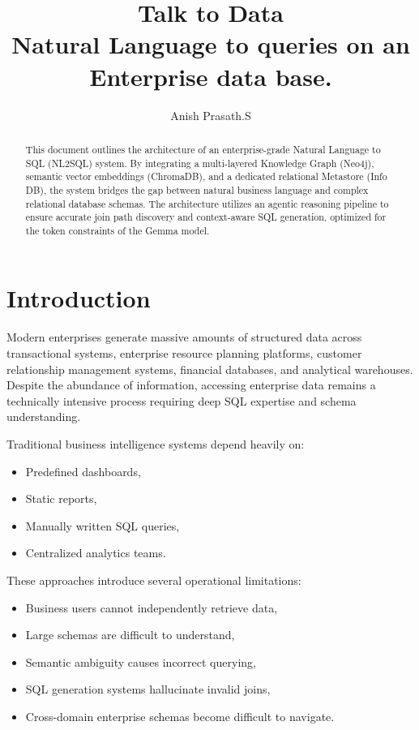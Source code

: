 \documentclass[11pt,a4paper]{article}
\title{
    \textbf{Talk to Data} \\
    \large Natural Language to queries on an Enterprise data base.
}
\author{Anish Prasath.S}
\date{}
\begin{document}
\maketitle
\begin{abstract}
This document outlines the architecture of an enterprise-grade Natural Language to SQL (NL2SQL) system. By integrating a multi-layered Knowledge Graph (Neo4j), semantic vector embeddings (ChromaDB), and a dedicated relational Metastore (Info DB), the system bridges the gap between natural business language and complex relational database schemas. The architecture utilizes an agentic reasoning pipeline to ensure accurate join path discovery and context-aware SQL generation, optimized for the token constraints of the Gemma model.
\end{abstract}


\section{Introduction}

Modern enterprises generate massive amounts of structured data across transactional systems, enterprise resource planning platforms, customer relationship management systems, financial databases, and analytical warehouses. Despite the abundance of information, accessing enterprise data remains a technically intensive process requiring deep SQL expertise and schema understanding.

Traditional business intelligence systems depend heavily on:
\begin{itemize}
    \item Predefined dashboards,
    \item Static reports,
    \item Manually written SQL queries,
    \item Centralized analytics teams.
\end{itemize}

These approaches introduce several operational limitations:
\begin{itemize}
    \item Business users cannot independently retrieve data,
    \item Large schemas are difficult to understand,
    \item Semantic ambiguity causes incorrect querying,
    \item SQL generation systems hallucinate invalid joins,
    \item Cross-domain enterprise schemas become difficult to navigate.
\end{itemize}
\end{document}
